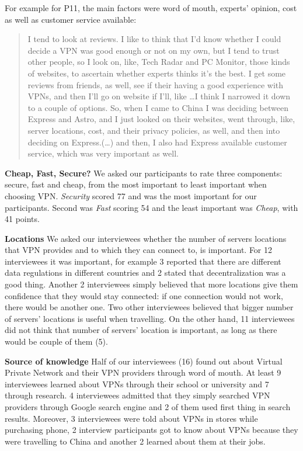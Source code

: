 For example for P11, the main factors were word of mouth, experts’ opinion, cost as well as customer service available:
\begin{quote}I tend to look at reviews. I like to think that I'd know whether I could decide a VPN was good enough or not on my own, but I tend to trust other people, so I look on, like, Tech Radar and PC Monitor, those kinds of websites, to ascertain whether experts thinks it's the best. I get some reviews from friends, as well, see if their having a good experience with VPNs, and then I'll go on website if I'll, like \dots I think I narrowed it down to a couple of options. So, when I came to China I was deciding between Express and Astro, and I just looked on their websites, went through, like, server locations, cost, and their privacy policies, as well, and then into deciding on Express.(\dots)
and then, I also had Express available customer service, which was very important as well.\end{quote}

\textbf{Cheap, Fast, Secure?} We asked our participants to rate three components: secure, fast and cheap, from the most important to least important when choosing VPN. \textit{Security} scored 77 and was the most important for our participants. Second was \textit{Fast} scoring 54 and the least important was \textit{Cheap}, with 41 points.


\textbf{Locations} We asked our interviewees whether the number of servers locations that VPN provides and to which they can connect to, is important. For 12 interviewees it was important, for example 3 reported that there are different data regulations in different countries and 2 stated that decentralization was a good thing. Another 2 interviewees simply believed that more locations give them confidence that they would stay connected: if one connection would not work, there would be another one. Two other interviewees believed that bigger number of servers’ locations is useful when travelling.  On the other hand, 11 interviewees did not think that number of servers’ location is important, as long as there would be couple of them (5).  

\textbf{Source of knowledge}
Half of our interviewees (16) found out about Virtual Private Network and their VPN providers through word of mouth. At least 9 interviewees learned about VPNs through their school or university and 7 through research. 4 interviewees admitted that they simply searched VPN providers through Google search engine and 2 of them used first thing in search results. Moreover, 3 interviewees were told about VPNs in stores while purchasing phone, 2 interview participants got to know about VPNs because they were travelling to China and another 2 learned about them at their jobs.


